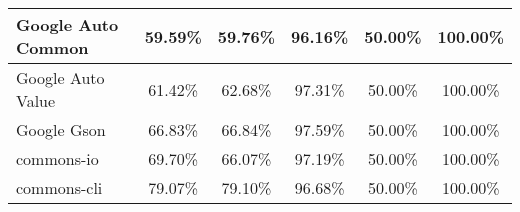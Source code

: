 \documentclass[../../main]{subfiles}
\begin{document}
\begin{table}[!htb]
\begin{tabular}{|l|c|c|c|c|c|}
Google Auto Common            & 59.59\%                                                                                 & 59.76\%                                                                                     & 96.16\%                                                                              & 50.00\%                                                                               & 100.00\%                                                                             \\ \hline
Google Auto Value             & 61.42\%                                                                                 & 62.68\%                                                                                     & 97.31\%                                                                              & 50.00\%                                                                               & 100.00\%                                                                             \\ \hline
Google Gson                   & 66.83\%                                                                                 & 66.84\%                                                                                     & 97.59\%                                                                              & 50.00\%                                                                               & 100.00\%                                                                             \\ \hline
commons-io                    & 69.70\%                                                                                 & 66.07\%                                                                                     & 97.19\%                                                                              & 50.00\%                                                                               & 100.00\%                                                                             \\ \hline
commons-cli                   & 79.07\%                                                                                 & 79.10\%                                                                                     & 96.68\%                                                                              & 50.00\%                                                                               & 100.00\%                                                                             \\ \hline

\end{tabular}
\end{table}
\end{document}
